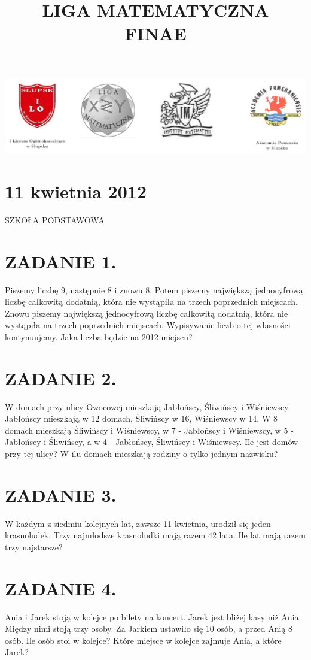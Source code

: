 \documentclass[10pt]{article}
\title{LIGA MATEMATYCZNA \\
 FINAE }
\author{}
\date{}
\begin{document}
\maketitle
\begin{center}
\includegraphics[max width=\textwidth]{2024_11_21_a1bccce644610f08c774g-1(1)}
\end{center}

\section*{11 kwietnia 2012}
SZKOŁA PODSTAWOWA

\section*{ZADANIE 1.}
Piszemy liczbę 9, następnie 8 i znowu 8. Potem piszemy największą jednocyfrową liczbę całkowitą dodatnią, która nie wystąpiła na trzech poprzednich miejscach. Znowu piszemy największą jednocyfrową liczbę całkowitą dodatnią, która nie wystąpiła na trzech poprzednich miejscach. Wypisywanie liczb o tej własności kontynuujemy. Jaka liczba będzie na 2012 miejscu?

\section*{ZADANIE 2.}
W domach przy ulicy Owocowej mieszkają Jabłońscy, Śliwińscy i Wiśniewscy. Jabłońscy mieszkają w 12 domach, Śliwińscy w 16, Wiśniewscy w 14. W 8 domach mieszkają Śliwińscy i Wiśniewscy, w 7 - Jabłońscy i Wiśniewscy, w 5 - Jabłońscy i Śliwińscy, a w 4 - Jabłońscy, Śliwińscy i Wiśniewscy. Ile jest domów przy tej ulicy? W ilu domach mieszkają rodziny o tylko jednym nazwisku?

\section*{ZADANIE 3.}
W każdym z siedmiu kolejnych lat, zawsze 11 kwietnia, urodził się jeden krasnoludek. Trzy najmłodsze krasnoludki mają razem 42 lata. Ile lat mają razem trzy najstarsze?

\section*{ZADANIE 4.}
Ania i Jarek stoją w kolejce po bilety na koncert. Jarek jest bliżej kasy niż Ania. Między nimi stoją trzy osoby. Za Jarkiem ustawiło się 10 osób, a przed Anią 8 osób. Ile osób stoi w kolejce? Które miejsce w kolejce zajmuje Ania, a które Jarek?
\end{document}
